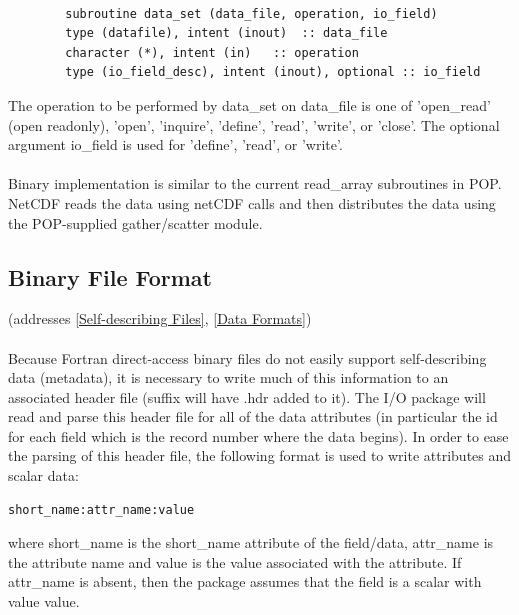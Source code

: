 \documentclass[11pt]{article}
\begin{document}
\begin{verbatim}

		subroutine data_set (data_file, operation, io_field)
		type (datafile), intent (inout)  :: data_file
		character (*), intent (in)   :: operation
		type (io_field_desc), intent (inout), optional :: io_field

\end{verbatim}
\noindent
The operation to be performed by data\_set on data\_file is one of
'open\_read' (open readonly), 'open', 'inquire', 'define',
'read', 'write', or 'close'.
The optional argument io\_field is used for
'define', 'read', or 'write'.

\paragraph{}
Binary implementation is similar to the current read\_array
subroutines in POP.
NetCDF reads the data using netCDF calls and then distributes the
data using the POP-supplied gather/scatter module.

\subsection{Binary File Format}
\label{Binary File Format}
(addresses \ref{Self-describing Files}, \ref{Data Formats})
\paragraph{}
Because Fortran direct-access binary files do not easily support
self-describing data (metadata), it is necessary to write much
of this information to an associated header file
(suffix will have .hdr added to it).
The I/O package will read and parse this header file
for all of the data attributes
(in particular the id for each field which is the record number
where the data begins).
In order to ease the parsing of this header file, the following
format is used to write attributes and scalar data:
\begin{verbatim}
short_name:attr_name:value
\end{verbatim}
\noindent
where short\_name is the short\_name attribute of the field/data,
attr\_name is the attribute name and value is the value associated
with the attribute.
If attr\_name is absent, then the package assumes that the field
is a scalar with value value.
\end{document}
